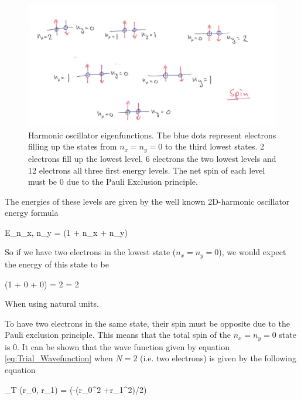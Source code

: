 \begin{figure}[h!]
	\centering 
	\includegraphics[width=\textwidth]{theory/psi_levels.jpg}
	\caption{Harmonic oscillator eigenfunctions. The blue dots represent electrons filling up the states from $n_x = n_y = 0$ to the third lowest states. 
	2 electrons fill up the lowest level, 6 electrons the two lowest levels and 12 electrons all three first energy levels.
	The net spin of each level must be $0$ due to the Pauli Exclusion principle. }
	\label{fig:psi_levels}
\end{figure}


The energies of these levels are given by the well known 2D-harmonic oscillator energy formula

\eqs
E_{n_x, n_y} = \hbar \omega (1 + n_x + n_y)
\eqf

So if we have two electrons in the lowest state ($n_x = n_y = 0$), we would expect the energy of this state to be 

 \cdot \hbar \omega (1 + 0 + 0) = 2 \hbar \omega = 2 \omega 
\eqf

When using natural units.

To have two electrons in the same state, their spin must be opposite due to the Pauli exclusion principle. 
This means that the total spin of the $n_x = n_y = 0$ state is $0$. 
It can be shown that the wave function given by equation \ref{eq:Trial_Wavefunction} when $N=2$ (i.e. two electrons) is given by the following equation

\eqs
\Psi_T (\vec r_0, \vec r_1) = \exp(-\alpha \omega (r_0^2 +r_1^2)/2) \cdot \J
\eqf

